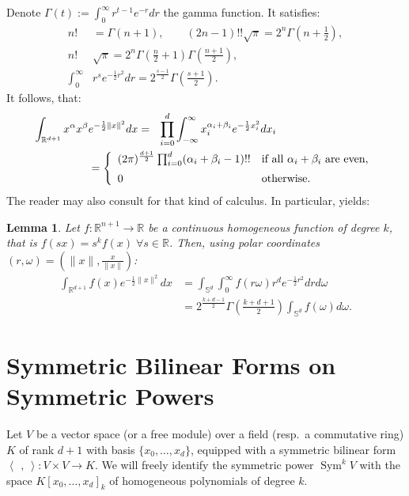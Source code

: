 \documentclass{amsart}
\DeclareMathOperator{\Sym}{Sym}
\newcommand{\coloneqq}{:=}
\newcommand{\R}{\mathbb{R}}
\renewcommand{\S}{\mathbb{S}}
\theoremstyle{plain}
\newtheorem{lemma}[theorem]{Lemma}
\theoremstyle{definition}
\theoremstyle{remark}
\begin{document}
Denote $\Gamma(t) \coloneqq \int_{0}^{\infty}r^{t-1}e^{-r}dr$ the gamma function. It satisfies:
\begin{align}
\label{ffgamma}
n!&=\Gamma(n+1),\qquad (2n-1)!!\sqrt{\pi} =2^{n}\Gamma\left(n+\tfrac{1}{2}\right), \\
\label{doublegamma}
n!&\sqrt{\pi}=2^{n}\Gamma\left(\tfrac{n}{2}+1\right)\Gamma\left(\tfrac{n+1}{2}\right) ,\\
\int_0^\infty& r^se^{-\frac{1}{2}r^2} dr = 2^{\frac{s-1}{2}}\Gamma\left(\tfrac{s+1}{2}\right).
\end{align}
It follows, that:
\begin{align}    \label{monoint}
 \int_{\R^{d+1}}x^\alpha x^\beta & e^{-\frac{1}{2}\|x\|^2} dx = \ \ 
\displaystyle \prod_{i=0}^d \int_{-\infty}^\infty x_i^{\alpha_i+\beta_i} e^{-\frac{1}{2}x_i^2} dx_i \\
 &= \left\{
\begin{array}{*2{l}p{5cm}}
(2 \pi)^{\frac{d+1}{2}}\prod_{i=0}^d (\alpha_i+\beta_i-1)!! &\text{if all }\alpha_i+\beta_i\text{ are even}, \vspace{0.2cm} \\ 
 0 &\text{otherwise}.
\end{array}
  \right.\nonumber
\end{align}
The reader may also consult \cite{Folland} for that kind of calculus. In particular, \cite[Eq.~(4)]{Folland} yields:
\begin{lemma}\label{homosphere}
Let $f:\R^{n+1}\rightarrow\R$ be a continuous homogeneous function of degree $k$, that is $f(sx) = s^kf(x)\; \forall s\in\!\R$. Then, using polar coordinates $(r,\omega) = (\|x\|,\frac{x}{\|x\|})$:
\begin{align*}
\int_{\R^{d+1}}f(x)e^{-\frac{1}{2}\|x\|^2} dx &= \int_{\S^d}\!\int_0^\infty\! f(r\omega) r^d e^{-\frac{1}{2}r^2}dr d\omega \\
&= 2^{\frac{k+d-1}{2}}\Gamma\!\left(\tfrac{k+d+1}{2}\right)\int_{\S^d}f(\omega)d\omega .
\end{align*}
\end{lemma}



\section{Symmetric Bilinear Forms on Symmetric Powers} \label{symSection}
Let $V$ be a vector space (or a free module) over a field (resp.~a commutative ring) $K$ of rank $d+1$ with basis $\{x_0,\ldots,x_{d}\}$, equipped with a symmetric bilinear form $\left<\,\ ,\ \right>: V\times V \rightarrow K$. We will freely identify the symmetric power $\Sym^kV$ with the space $K[x_0,\ldots,x_d]_k$ of homogeneous polynomials of degree $k$. 
\end{document}
